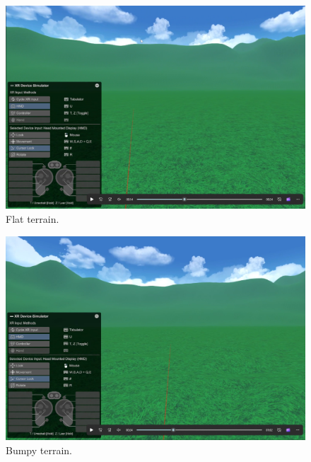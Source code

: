 \documentclass[american]{acmtog} %
\begin{document}
\begin{figure}[H]
\centerline{\includegraphics[width=\columnwidth]{figures/flat_terrain.png}}
\caption{Flat terrain.}
    \label{fig:flat_terrain}
\end{figure}

\begin{figure}[H]
\centerline{\includegraphics[width=\columnwidth]{figures/bumpy_terrain.png}}
\caption{Bumpy terrain.}
    \label{fig:bumpy_terrain}
\end{figure}
\end{document}
